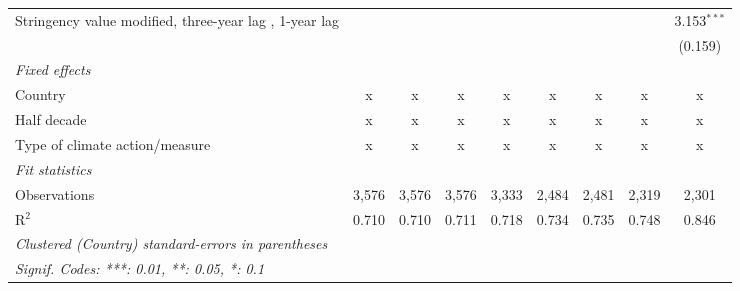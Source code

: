 \begin{table}[htbp]
\begin{tabular}{lcccccccc}
      Stringency value modified, three-year lag , 1-year lag                                             &         &         &             &              &               &               &              & 3.153$^{***}$\\   
                                                                                                         &         &         &             &              &               &               &              & (0.159)\\   
      \emph{Fixed effects}\\
      Country                                                                                            & x       & x       & x           & x            & x             & x             & x            & x\\  
      Half decade                                                                                        & x       & x       & x           & x            & x             & x             & x            & x\\  
      Type of climate action/measure                                                                     & x       & x       & x           & x            & x             & x             & x            & x\\  
      \midrule \emph{Fit statistics}\\
      Observations                                                                                       & 3,576   & 3,576   & 3,576       & 3,333        & 2,484         & 2,481         & 2,319        & 2,301\\  
      R$^2$                                                                                              & 0.710   & 0.710   & 0.711       & 0.718        & 0.734         & 0.735         & 0.748        & 0.846\\  
      \midrule
      \multicolumn{9}{l}{\emph{Clustered (Country) standard-errors in parentheses}}\\
      \multicolumn{9}{l}{\emph{Signif. Codes: ***: 0.01, **: 0.05, *: 0.1}}\\
   \end{tabular}
\end{table}


